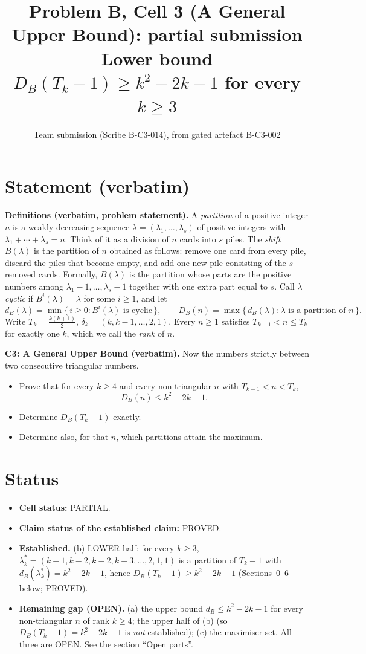 \documentclass[11pt]{article}
\title{Problem B, Cell 3 (A General Upper Bound): partial submission\\[2pt]
\large Lower bound $D_B(T_k-1)\ge k^2-2k-1$ for every $k\ge 3$}
\author{Team submission (Scribe B-C3-014), from gated artefact B-C3-002}
\date{}
\theoremstyle{remark}
\begin{document}
\maketitle

\section*{Statement (verbatim)}

\textbf{Definitions (verbatim, problem statement).} A \emph{partition} of a positive integer $n$ is a weakly
decreasing sequence $\lambda=(\lambda_1,\ldots,\lambda_s)$ of positive integers with $\lambda_1+\cdots+\lambda_s=n$.
Think of it as a division of $n$ cards into $s$ piles.
The \emph{shift} $B(\lambda)$ is the partition of $n$ obtained as follows: remove one card from every pile,
discard the piles that become empty, and add one new pile consisting of the $s$ removed cards. Formally,
$B(\lambda)$ is the partition whose parts are the positive numbers among $\lambda_1-1,\ldots,\lambda_s-1$ together
with one extra part equal to $s$.
Call $\lambda$ \emph{cyclic} if $B^i(\lambda)=\lambda$ for some $i\ge 1$, and let
\[
d_B(\lambda)=\min\{\,i\ge 0: B^i(\lambda)\text{ is cyclic}\,\},\qquad
D_B(n)=\max\{\,d_B(\lambda):\lambda\text{ is a partition of } n\,\}.
\]
Write $T_k=\frac{k(k+1)}{2}$, $\delta_k=(k,k-1,\ldots,2,1)$. Every $n\ge 1$ satisfies $T_{k-1}<n\le T_k$ for
exactly one $k$, which we call the \emph{rank} of $n$.

\medskip
\textbf{C3: A General Upper Bound (verbatim).} Now the numbers strictly between two consecutive triangular numbers.
\begin{itemize}
\item[(a)] Prove that for every $k\ge4$ and every non-triangular $n$ with $T_{k-1}<n<T_k$,
\[ D_B(n)\le k^2-2k-1. \]
\item[(b)] Determine $D_B(T_k-1)$ exactly.
\item[(c)] Determine also, for that $n$, which partitions attain the maximum.
\end{itemize}

\section*{Status}

\begin{itemize}
\item \textbf{Cell status:} PARTIAL.
\item \textbf{Claim status of the established claim:} PROVED.
\item \textbf{Established.} (b) LOWER half: for every $k\ge 3$,
$\lambda^*_k=(k-1,k-2,k-2,k-3,\ldots,2,1,1)$ is a partition of $T_k-1$ with $d_B(\lambda^*_k)=k^2-2k-1$, hence
$D_B(T_k-1)\ge k^2-2k-1$ (Sections~0--6 below; PROVED).
\item \textbf{Remaining gap (OPEN).} (a) the upper bound $d_B\le k^2-2k-1$ for every non-triangular $n$ of rank
$k\ge4$; the upper half of (b) (so $D_B(T_k-1)=k^2-2k-1$ is \emph{not} established); (c) the maximiser set.
All three are OPEN. See the section ``Open parts''.
\end{itemize}
\end{document}
